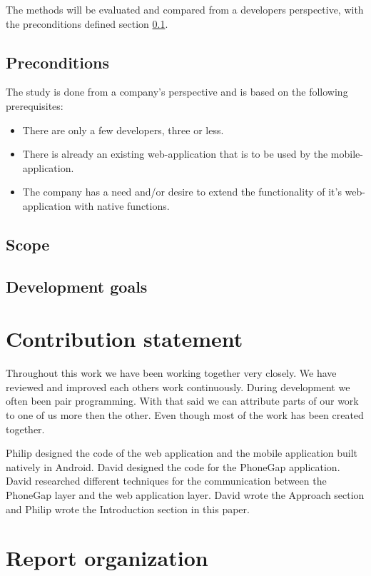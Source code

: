The methods will be evaluated and compared from a developers perspective, with the preconditions defined section \ref{section-preconditions}.

\subsection{Preconditions} \label{section-preconditions}
The study is done from a company's perspective and is based on the following prerequisites:
\begin{itemize}
\item There are only a few developers, three or less.
\item There is already an existing web-application that is to be used by the mobile-application.
\item The company has a need and/or desire to extend the functionality of it's web-application with native functions.
\end{itemize}

\subsection{Scope} \label{subsection-scope}

\subsection{Development goals} \label{subsection-development-goals}

\section{Contribution statement}\label{section-contribution-statement}
Throughout this work we have been working together very closely. We have reviewed and improved each others work continuously. During development we often been pair programming. With that said we can attribute parts of our work to one of us more then the other. Even though most of the work has been created together. 

Philip designed the code of the web application and the mobile application built natively in Android. David designed the code for the PhoneGap application. David researched different techniques for the communication between the PhoneGap layer and the web application layer. David wrote the Approach section and Philip wrote the Introduction section in this paper. 


\section{Report organization}\label{section-report-organization}
